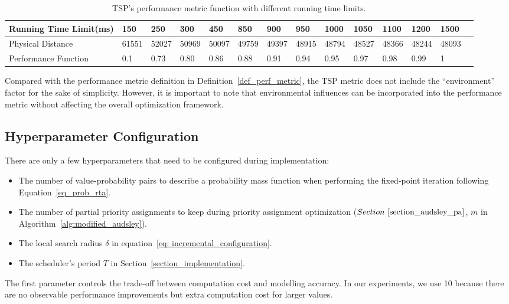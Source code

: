 \begin{table}[]
    \centering
    \caption{TSP's performance metric function with different running time limits.}
    \begin{tabular}{@{}llllllllllllll@{}}
        \toprule
        Running Time Limit(ms)       & 150   & 250   & 300   & 450   & 850   & 900   & 950   & 1000  & 1050  & 1100  & 1200  & 1500   \\ \midrule
        Physical Distance  & 61551 & 52027 & 50969 & 50097 & 49759 & 49397 & 48915 & 48794 & 48527 & 48366 & 48244 & 48093 \\
        Performance Function & 0.1   & 0.73  & 0.80 & 0.86  & 0.88  & 0.91  & 0.94  & 0.95  & 0.97  & 0.98  & 0.99  & 1        \\ \bottomrule
    \end{tabular}
    \label{table_tsp_perf}
\end{table}

Compared with the performance metric definition in Definition~\ref{def_perf_metric}, the TSP metric does not include the ``environment'' factor for the sake of simplicity.
However, it is important to note that environmental influences can be incorporated into the performance metric without affecting the overall optimization framework.


\subsection{Hyperparameter Configuration}

There are only a few hyperparameters that need to be configured during implementation:
\begin{itemize}
    \item The number of value-probability pairs to describe a probability mass function when performing the fixed-point iteration following Equation~\eqref{eq_prob_rta}.
    \item The number of partial priority assignments to keep during priority assignment optimization ($Section~\ref{section_audsley_pa}$, $m$ in Algorithm~\ref{alg:modified_audsley}).
    \item The local search radius $\delta$ in equation~\eqref{eq: incremental_configuration}.
    \item The scheduler's period $T$ in Section~\ref{section_implementation}.
\end{itemize}
The first parameter controls the trade-off between computation cost and modelling accuracy.
In our experiments, we use 10 because there are no observable performance improvements but extra computation cost for larger values.

